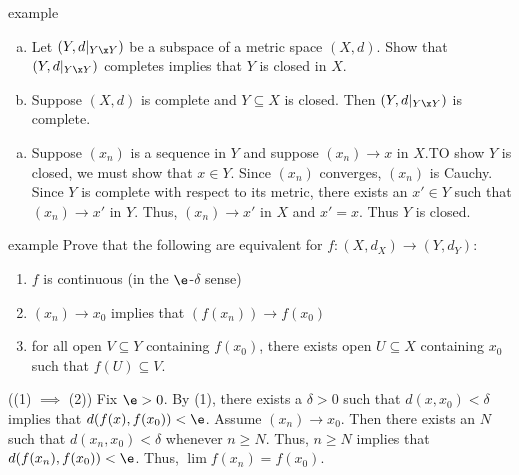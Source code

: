 \documentclass[class=article, crop=false]{standalone}
\begin{document}
\begin{understandingcheck}{example}
  \begin{enumerate}[(a)]
    \item Let $(Y,d|_{Y \x Y})$ be a subspace of a metric space $(X,d)$. Show that $(Y,d|_{Y \x Y})$ completes implies that $Y$ is closed in $X$.

    \item Suppose $(X,d)$ is complete and $Y \subseteq X$ is closed. Then $(Y,d|_{Y \x Y})$ is complete.
  \end{enumerate}

  \begin{pf}
    \begin{enumerate}[(a)]
      \item Suppose $(x_n)$ is a sequence in $Y$ and suppose $(x_n) \to x$ in $X$.TO show $Y$ is closed, we must show that $x\in Y$. Since $(x_n)$ converges, $(x_n)$ is Cauchy. Since $Y$ is complete with respect to its metric, there exists an $x' \in Y$ such that $(x_n) \to x'$ in $Y$. Thus, $(x_n) \to x'$ in $X$ and $x'=x$. Thus $Y$ is closed.
    \end{enumerate}
  \end{pf}
\end{understandingcheck}

\begin{understandingcheck}{example}
  Prove that the following are equivalent for $f\colon (X,d_X) \to (Y,d_Y)$:
  \begin{enumerate}[(1)]
    \item $f$ is continuous (in the $\e$-$\delta$ sense)
    \item $(x_n) \to x_0$ implies that $(f(x_n)) \to f(x_0)$
    \item for all open $V\subseteq Y$ containing $f(x_0)$, there exists open $U\subseteq X$ containing $x_0$ such that $f(U) \subseteq V$.
  \end{enumerate}

  \begin{pf}
    ((1) $\implies$ (2)) Fix $\e  >0 $. By (1), there exists a $\delta > 0$ such that $d(x,x_0) < \delta$ implies that $d(f(x),f(x_0)) < \e$. Assume $(x_n) \to x_0$. Then there exists an $N$ such that $d(x_n,x_0) < \delta$ whenever $n \geq N$. Thus, $n \geq N$ implies that $d(f(x_n),f(x_0)) < \e$. Thus, $\lim f(x_n) = f(x_0)$.
  \end{pf}
\end{understandingcheck}
\end{document}
